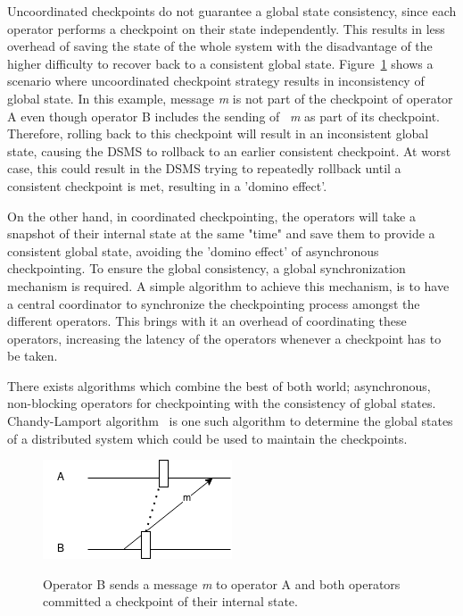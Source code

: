 Uncoordinated checkpoints do not guarantee a global state consistency, since 
each operator performs a checkpoint on their state independently. This results 
in less overhead of saving the state of the whole system with the disadvantage of the higher 
difficulty to recover back to a consistent global state. Figure~\ref{fig:checkpoint_inconsistency}
shows a scenario where uncoordinated checkpoint strategy results in inconsistency of 
global state. In this example, message \emph{m} is not part of the checkpoint of operator 
A even though operator B includes the sending of ~\emph{m} as part of its checkpoint. Therefore, 
rolling back to this checkpoint will result in an inconsistent global state, causing the 
DSMS to rollback to an earlier consistent checkpoint. At worst case, this could result 
in the DSMS trying to repeatedly rollback until a consistent checkpoint is met, 
resulting in a 'domino effect'.  

On the other hand, in coordinated checkpointing, the operators will take a snapshot 
of their internal state at the same "time" and save them to provide a consistent 
global state, avoiding the 'domino effect' of asynchronous checkpointing. To ensure 
the global consistency, a global synchronization mechanism is required. A simple 
algorithm to achieve this mechanism, is to have a central coordinator to synchronize 
the checkpointing process amongst the different operators. This brings with it an overhead 
of coordinating these operators, increasing the latency of the operators whenever a 
checkpoint has to be taken. 


There exists algorithms which combine the best of both world; asynchronous, non-blocking
operators for checkpointing with the consistency of global states. 
Chandy-Lamport algorithm~\cite{chandy_lamport} is one such algorithm to determine the 
global states of a distributed system which could be used to maintain the checkpoints. 

\begin{figure}[!htbp]
    \centering
    \includegraphics{fig/checkpoint_inconsistency.png}
    \label{fig:checkpoint_inconsistency}
    \caption{Operator B sends a message \emph{m} to operator A and both operators 
    committed a checkpoint of their internal state.}
\end{figure}

